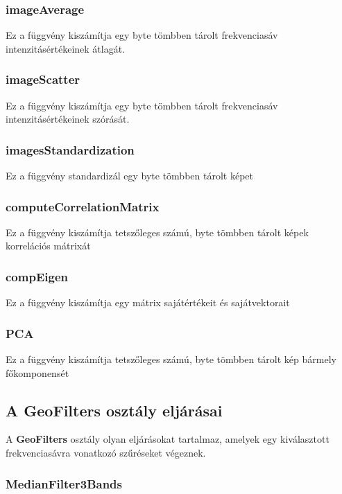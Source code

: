 \documentclass[a4paper,12pt]{article}
\begin{document}
\subsubsection{imageAverage}

Ez a függvény kiszámítja egy byte tömbben tárolt frekvenciasáv intenzitásértékeinek átlagát.

\subsubsection{imageScatter}

Ez a függvény kiszámítja egy byte tömbben tárolt frekvenciasáv intenzitásértékeinek szórását.

\subsubsection{imagesStandardization}

Ez a függvény standardizál egy byte tömbben tárolt képet

\subsubsection{computeCorrelationMatrix}

Ez a függvény kiszámítja tetszőleges számú, byte tömbben tárolt képek korrelációs mátrixát

\subsubsection{compEigen}

Ez a függvény kiszámítja egy mátrix sajátértékeit és sajátvektorait

\subsubsection{PCA}

Ez a függvény kiszámítja tetszőleges számú, byte tömbben tárolt kép bármely főkomponensét



\subsection{A \textbf{GeoFilters} osztály eljárásai}

A \textbf{GeoFilters} osztály olyan eljárásokat tartalmaz, amelyek egy kiválasztott frekvenciasávra vonatkozó szűréseket végeznek.

\subsubsection{MedianFilter3Bands}
\end{document}

